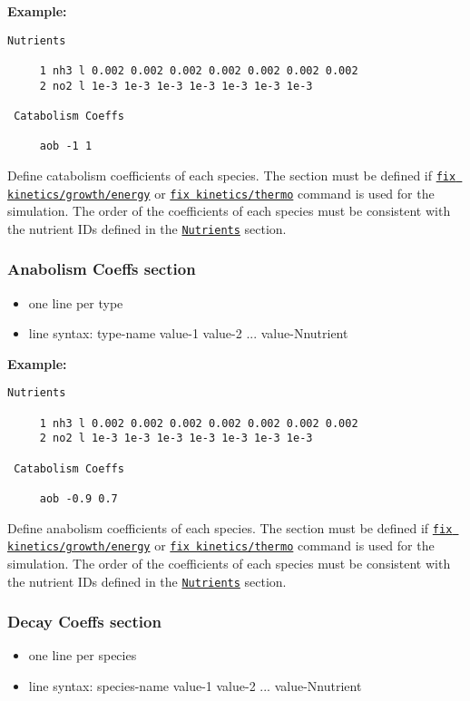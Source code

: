 \documentclass[11pt,a4paper,openright]{article}
\begin{document}
\textbf{Example:}
\begin{Verbatim}[frame=single]
 Nutrients

     1 nh3 l 0.002 0.002 0.002 0.002 0.002 0.002 0.002
     2 no2 l 1e-3 1e-3 1e-3 1e-3 1e-3 1e-3 1e-3
     
 Catabolism Coeffs
         
     aob -1 1

\end{Verbatim}

Define catabolism coefficients of each species. 
The section must be defined if 
\hyperref[fkineticsenergy]{\tt fix kinetics/growth/energy}
or
\hyperref[fkineticsthermo]{\tt fix kinetics/thermo}
command is used for the simulation. 
The order of the coefficients of each species must be consistent 
with the nutrient IDs defined in the \hyperref[snutrients]{\tt Nutrients} section.


\subsubsection{Anabolism Coeffs section}
\label{sana}
\begin{itemize} [nosep]
    \item one line per type
    \item line syntax: type-name {} value-1 value-2 ... value-Nnutrient\\
    
\end{itemize} 

\textbf{Example:}
\begin{Verbatim}[frame=single]
 Nutrients

     1 nh3 l 0.002 0.002 0.002 0.002 0.002 0.002 0.002
     2 no2 l 1e-3 1e-3 1e-3 1e-3 1e-3 1e-3 1e-3
     
 Catabolism Coeffs
         
     aob -0.9 0.7

\end{Verbatim}

Define anabolism coefficients of each species. 
The section must be defined if 
\hyperref[fkineticsenergy]{\tt fix kinetics/growth/energy}
or
\hyperref[fkineticsthermo]{\tt fix kinetics/thermo}
command is used for the simulation. 
The order of the coefficients of each species must be consistent 
with the nutrient IDs defined in the \hyperref[snutrients]{\tt Nutrients} section.     
     

\subsubsection{Decay Coeffs section}
\label{sdecaycoeffs}
\begin{itemize} [nosep]
    \item one line per species
    \item line syntax: species-name {} value-1 value-2 ... value-Nnutrient\\
    
\end{itemize} 
\end{document}
